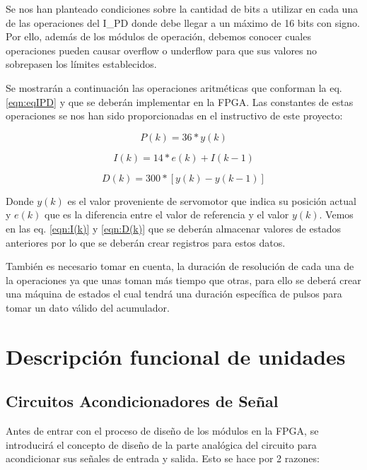 \documentclass[12pt,a4paper]{article} %
\begin{document}
Se nos han planteado condiciones sobre la cantidad de bits a utilizar en cada una de las operaciones del I\_PD donde debe llegar a un máximo de 16 bits con signo. Por ello, además de los módulos de operación, debemos conocer cuales operaciones pueden causar overflow o underflow para que sus valores no sobrepasen los límites establecidos. 

Se mostrarán a continuación las operaciones aritméticas que conforman la eq. \ref{eqn:eqIPD} y que se deberán implementar en la FPGA. Las constantes de estas operaciones se nos han sido proporcionadas en el instructivo de este proyecto: 

\begin{equation}\label{eqn:P(k)}
P(k)=36*y(k)
\end{equation}

\begin{equation}\label{eqn:I(k)}
I(k)=14*e(k)+I(k-1)
\end{equation}

\begin{equation}\label{eqn:D(k)}
D(k)=300*[y(k)-y(k-1)]
\end{equation}

Donde $y(k)$ es el valor proveniente de servomotor que indica su posición actual y $e(k)$ que es la diferencia entre el valor de referencia y el valor $y(k)$. Vemos en las eq. \ref{eqn:I(k)} y \ref{eqn:D(k)} que se deberán almacenar valores de estados anteriores por lo que se deberán crear registros para estos datos.

También es necesario tomar en cuenta, la duración de resolución de cada una de la operaciones ya que unas toman más tiempo que otras, para ello se deberá crear una máquina de estados el cual tendrá una duración específica de pulsos para tomar un dato válido del acumulador.


\section{Descripción funcional de unidades}


\subsection{Circuitos Acondicionadores de Señal}

Antes de entrar con el proceso de diseño de los módulos en la FPGA, se introducirá el concepto de diseño de la parte analógica del circuito para acondicionar sus señales de entrada y salida. Esto se hace por 2 razones:
\end{document}

